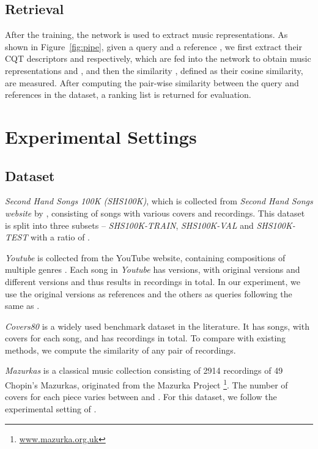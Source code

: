 \documentclass{article}
\newcommand{\figref}[1]{\mbox{Figure~\ref{#1}}}
\begin{document}
\subsection{Retrieval}
After the training, the network is used to extract music representations. As shown in \figref{fig:pipe}, given a query  and a reference , we first extract their CQT descriptors  and  respectively, which are fed into the network to obtain music representations  and , and then the similarity , defined as their cosine similarity, are measured.
After computing the pair-wise similarity between the query and references in the dataset, a ranking list is returned for evaluation.




\section{Experimental Settings}
\label{sec:evaluation}

\subsection{Dataset}


\textit{Second Hand Songs 100K (SHS100K)}, which is collected from \textit{Second Hand Songs website} by \cite{xu2018key}, consisting of  songs with various covers and  recordings. This dataset is split into three subsets -- \textit{SHS100K-TRAIN}, \textit{SHS100K-VAL} and \textit{SHS100K-TEST} with a ratio of .

\textit{Youtube} is collected from the YouTube website, containing  compositions of multiple genres \cite{silva2015music}. Each song in \textit{Youtube} has  versions, with  original versions and  different versions and thus results in  recordings in total. In our experiment, we use the  original versions as references and the others as queries following the same as \cite{silva2016simple,yu2019temporal,xu2018key}.

\textit{Covers80} is a widely used benchmark dataset in the literature. It has  songs, with  covers for each song, and has  recordings in total. To compare with existing methods, we compute the similarity of any pair of recordings.

\textit{Mazurkas} is a classical music collection consisting of 2914 recordings of 49 Chopin's Mazurkas, originated from the Mazurka Project \footnote{\url{www.mazurka.org.uk}}. The number of covers for each piece varies between  and . For this dataset, we follow the experimental setting of \cite{silva2016simple}.
\end{document}
